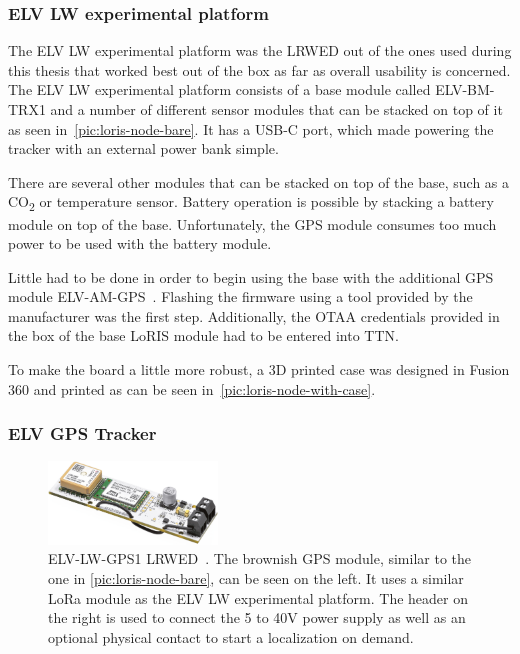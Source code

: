 \subsubsection{ELV LW experimental platform}\label{subsubsec:elv-lw-experimental-platform}

The ELV LW experimental platform was the \acl{LRWED} out of the ones used during this thesis that worked best out of the box as far as overall usability is concerned.
The ELV LW experimental platform consists of a base module called ELV-BM-TRX1 and a number of different sensor modules that can be stacked on top of it as seen in~\cref{pic:loris-node-bare}\cite{elv_elektronik_ag_elv-lw-base_2023}.
It has a USB-C port, which made powering the tracker with an external power bank simple.

There are several other modules that can be stacked on top of the base, such as a CO\textsubscript{2} or temperature sensor.
Battery operation is possible by stacking a battery module on top of the base.
Unfortunately, the \ac{GPS} module consumes too much power to be used with the battery module.

Little had to be done in order to begin using the base with the additional \ac{GPS} module ELV-AM-GPS~\cite{elv_elektronik_ag_elv-track_2022}.
Flashing the firmware using a tool provided by the manufacturer was the first step.
Additionally, the \ac{OTAA} credentials provided in the box of the base LoRIS module had to be entered into \ac{TTN}.

To make the board a little more robust, a 3D printed case was designed in Fusion 360 and printed as can be seen in~\cref{pic:loris-node-with-case}.

\subsubsection{ELV \acs{GPS} Tracker}\label{subsubsec:elv-gps-tracker-implementation}

\begin{figure}[htbp]
    \centering
    \includegraphics[width=0.4\textwidth]{pictures/hardware/gps-nodes/ELV-LW-GPS1.jpg}
    \caption{
        ELV-LW-GPS1 \acl{LRWED}~\protect\cite{elv_elektronik_ag_elv_2023}.
        The brownish \ac{GPS} module, similar to the one in \cref{pic:loris-node-bare}, can be seen on the left.
        It uses a similar \ac{LoRa} module as the ELV LW experimental platform.
        The header on the right is used to connect the 5 to 40V power supply as well as an optional physical contact to start a localization on demand.
    }
\end{figure}

